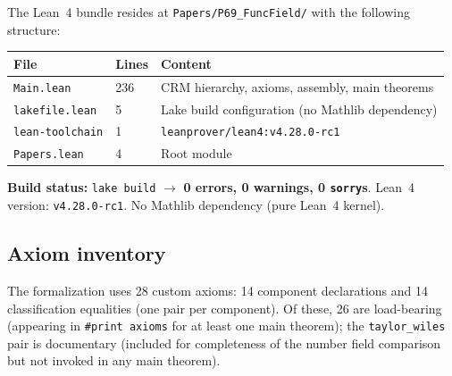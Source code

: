 \documentclass[11pt]{article}
\theoremstyle{plain}
\theoremstyle{definition}
\theoremstyle{remark}
\begin{document}
The Lean~4 bundle resides at \texttt{Papers/P69\_FuncField/} with the
following structure:

\begin{center}
\begin{tabular}{lll}
\toprule
\textbf{File} & \textbf{Lines} & \textbf{Content} \\
\midrule
\texttt{Main.lean} & 236 & CRM hierarchy, axioms, assembly, main theorems \\
\texttt{lakefile.lean} & 5 & Lake build configuration (no Mathlib dependency) \\
\texttt{lean-toolchain} & 1 & \texttt{leanprover/lean4:v4.28.0-rc1} \\
\texttt{Papers.lean} & 4 & Root module \\
\bottomrule
\end{tabular}
\end{center}

\medskip\noindent
\textbf{Build status:} \texttt{lake build} $\to$ \textbf{0 errors, 0 warnings,
0 \texttt{sorry}s}. Lean~4 version: \texttt{v4.28.0-rc1}. No Mathlib dependency
(pure Lean~4 kernel).

\subsection{Axiom inventory}

The formalization uses 28 custom axioms: 14 component declarations and 14
classification equalities (one pair per component). Of these, 26 are
load-bearing (appearing in \texttt{\#print axioms} for at least one main
theorem); the \texttt{taylor\_wiles} pair is documentary (included for
completeness of the number field comparison but not invoked in any main
theorem).
\end{document}
